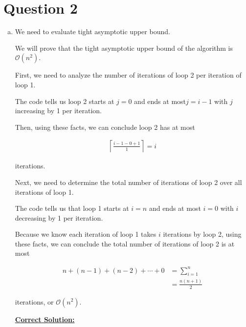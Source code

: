 \documentclass[12pt]{article}
\begin{document}
\section*{Question 2}
\begin{enumerate}[a.]
    \item

    We need to evaluate tight asymptotic upper bound.

    \bigskip

    We will prove that the tight asymptotic upper bound of the algorithm is
    $\mathcal{O}(n^2)$.

    \bigskip

    First, we need to analyze the number of iterations of loop 2 per iteration of
    loop 1.

    \bigskip

    The code tells us loop 2 starts at $j = 0$ and ends at most$j = i - 1$ with
    $j$ increasing by 1 per iteration.

    \bigskip

    Then, using these facts, we can conclude loop 2 has at most

    \setcounter{equation}{0}
    \begin{align}
        \left\lceil \frac{i-1-0+1}{1} \right\rceil = i
    \end{align}

    iterations.

    \bigskip

    Next, we need to determine the total number of iterations of loop 2 over all
    iterations of loop 1.

    \bigskip

    The code tells us that loop 1 starts at $i = n$ and ends at most $i = 0$ with
    $i$ decreasing by 1 per iteration.

    \bigskip

    Because we know each iteration of loop 1 takes $i$ iterations by loop 2, using
    these facts, we can conclude the total number of iterations of loop 2 is at most

    \begin{align}
        n + (n-1) + (n-2) + \cdots + 0 &= \sum\limits_{i=1}^n\\
        &= \frac{n(n+1)}{2}
    \end{align}

    iterations, or $\mathcal{O}(n^2)$.

    \bigskip

    \begin{mdframed}
        \underline{\textbf{Correct Solution:}}


\end{mdframed}
\end{enumerate}
\end{document}
